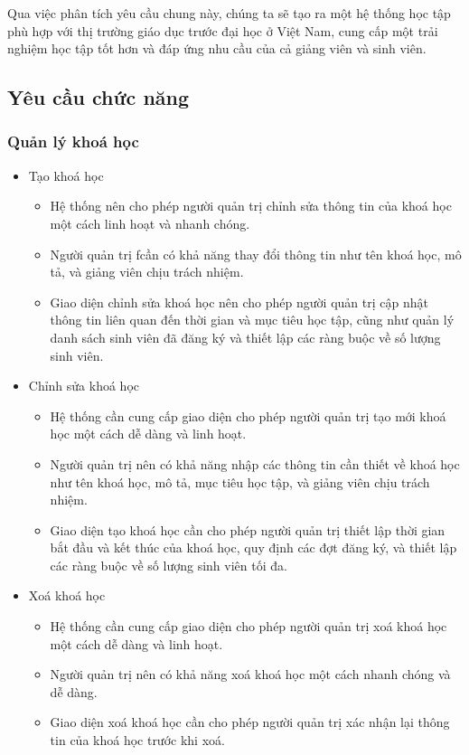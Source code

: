 \documentclass[../Thesis.tex]{subfiles}
\begin{document}
        Qua việc phân tích yêu cầu chung này, chúng ta sẽ tạo ra một hệ thống học tập phù hợp với thị trường giáo dục trước đại học ở Việt Nam, cung cấp một trải nghiệm học tập tốt hơn và đáp ứng nhu cầu của cả giảng viên và sinh viên.  
    
    \subsection{Yêu cầu chức năng}
        \subsubsection{Quản lý khoá học}
            \begin{itemize}
                \item Tạo khoá học
                    \begin{itemize}
                        \item Hệ thống nên cho phép người quản trị chỉnh sửa thông tin của khoá học một cách linh hoạt và nhanh chóng.
                        \item Người quản trị ƒcần có khả năng thay đổi thông tin như tên khoá học, mô tả, và giảng viên chịu trách nhiệm.
                        \item Giao diện chỉnh sửa khoá học nên cho phép người quản trị cập nhật thông tin liên quan đến thời gian và mục tiêu học tập, cũng như quản lý danh sách sinh viên đã đăng ký và thiết lập các ràng buộc về số lượng sinh viên.
                    \end{itemize}

                \item Chỉnh sửa khoá học
                    \begin{itemize}
                        \item Hệ thống cần cung cấp giao diện cho phép người quản trị tạo mới khoá học một cách dễ dàng và linh hoạt.
                        \item Người quản trị nên có khả năng nhập các thông tin cần thiết về khoá học như tên khoá học, mô tả, mục tiêu học tập, và giảng viên chịu trách nhiệm.
                        \item Giao diện tạo khoá học cần cho phép người quản trị thiết lập thời gian bắt đầu và kết thúc của khoá học, quy định các đợt đăng ký, và thiết lập các ràng buộc về số lượng sinh viên tối đa.
                    \end{itemize}
                \item Xoá khoá học
                    \begin{itemize}
                        \item Hệ thống cần cung cấp giao diện cho phép người quản trị xoá khoá học một cách dễ dàng và linh hoạt.
                        \item Người quản trị nên có khả năng xoá khoá học một cách nhanh chóng và dễ dàng.
                        \item Giao diện xoá khoá học cần cho phép người quản trị xác nhận lại thông tin của khoá học trước khi xoá.
                    \end{itemize}
            \end{itemize}
\end{document}
